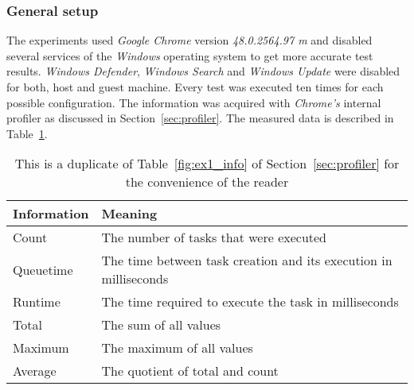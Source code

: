 \subsubsection{General setup}
The experiments used \emph{Google Chrome} version \emph{48.0.2564.97 m} and disabled several services of the \emph{Windows} operating system to get more accurate test results. \emph{Windows Defender}, \emph{Windows Search} and \emph{Windows Update} were disabled for both, host and guest machine. Every test was executed ten times for each possible configuration. The information was acquired with \emph{Chrome's} internal profiler as discussed in Section~\ref{sec:profiler}. The measured data is described in Table~\ref{fig:ex1_duplicate}.
\begin{table}[hb]
\caption{This is a duplicate of Table~\ref{fig:ex1_info} of Section~\ref{sec:profiler} for the convenience of the reader}
\label{fig:ex1_duplicate}
\begin{tabularx}{\textwidth}{|l|X|}
\hline
Information & Meaning \\ \hline
Count & The number of tasks that were executed \\ \hline
Queuetime & The time between task creation and its execution in milliseconds \\ \hline
Runtime & The time required to execute the task in milliseconds \\ \hline
Total & The sum of all values \\ \hline
Maximum & The maximum of all values \\ \hline
Average & The quotient of total and count \\ \hline
\end{tabularx}
\end{table}


\clearpage
